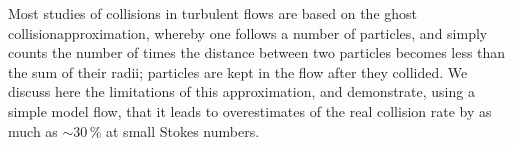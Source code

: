Most studies of collisions in turbulent flows are based on the \ldq ghost collision\rdq approximation, whereby one follows a number of particles, and simply counts the number of times the distance between two particles becomes less than the sum of their radii; particles are kept in the flow after they collided.
We discuss here the limitations of this approximation, and demonstrate, using a simple model flow, that it leads to overestimates of the real collision rate by as much as $\sim 30\,\%$ at small Stokes numbers.
